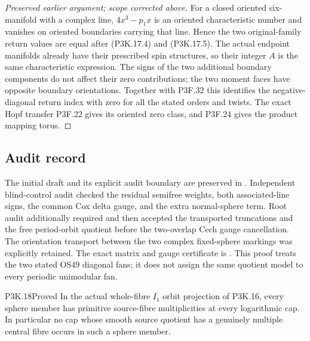 \begin{proof}[Preserved earlier argument; scope corrected above]
For a closed oriented six-manifold with a complex line,
\(4x^3-p_1x\) is an oriented characteristic number and
vanishes on oriented boundaries carrying that line.  Hence
the two original-family return values are equal after
(P3K.17.4) and (P3K.17.5).  The actual endpoint manifolds
already have their prescribed spin structures, so their
integer \(A\) is the same characteristic expression.
The signs of the two additional boundary components do not
affect their zero contributions; the two moment faces have
opposite boundary orientations.  Together with P3F.32 this identifies the negative-diagonal
return index with zero for all the stated orders and twists.
The exact Hopf transfer P3F.22 gives its oriented zero class,
and P3F.24 gives the product mapping torus.
\end{proof}

\subsection{Audit record}

The initial draft and its explicit audit boundary are preserved in
.
Independent blind-control audit checked the residual semifree weights,
both associated-line signs, the common Cox delta gauge, and the extra
normal-sphere term.  Root audit additionally required and then accepted
the transported truncations and the free period-orbit quotient before
the two-overlap Cech gauge cancellation.  The orientation transport
between the two complex fixed-sphere markings was explicitly retained.
The exact matrix and gauge certificate is .
This proof treats the two stated OS49 diagonal fans; it does not assign
the same quotient model to every periodic unimodular fan.

\begin{statement}{P3K.18}{Proved}
In the actual whole-fibre \(I_1\) orbit projection of P3K.16,
every sphere member has primitive source-fibre multiplicities
at every logarithmic cap.  In particular no cap whose smooth
source quotient has a genuinely multiple central fibre occurs
in such a sphere member.
\end{statement}

